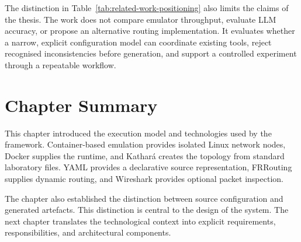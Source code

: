 The distinction in Table~\ref{tab:related-work-positioning} also limits the
claims of the thesis. The work does not compare emulator throughput, evaluate
LLM accuracy, or propose an alternative routing implementation. It evaluates
whether a narrow, explicit configuration model can coordinate existing tools,
reject recognised inconsistencies before generation, and support a controlled
experiment through a repeatable workflow.

\section{Chapter Summary}
\label{sec:chapter1-summary}

This chapter introduced the execution model and technologies used by the
framework. Container-based emulation provides isolated Linux network nodes,
Docker supplies the runtime, and Kathar\'a creates the topology from standard
laboratory files. YAML provides a declarative source representation,
FRRouting supplies dynamic routing, and Wireshark provides optional packet
inspection.

The chapter also established the distinction between source configuration and
generated artefacts. This distinction is central to the design of the system.
The next chapter translates the technological context into explicit
requirements, responsibilities, and architectural components.
